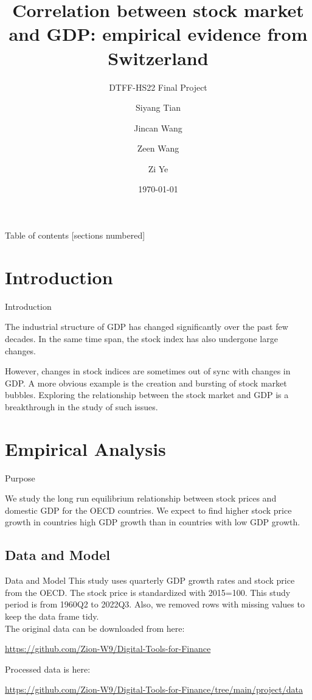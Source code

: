 \documentclass[10pt]{beamer}
\title{Correlation between stock market and GDP:
empirical evidence from Switzerland}
\subtitle{DTFF-HS22 Final Project}
\author{Siyang Tian \and Jincan Wang \and Zeen Wang \and Zi Ye}
\institute{University of Zurich}
\date{\today}
\begin{document}
\maketitle

\begin{frame}{Table of contents}
  [sections numbered]
  \tableofcontents%
\end{frame}

\section[Intro]{Introduction}

\begin{frame}{Introduction}

The industrial structure of GDP has changed significantly over the past few decades. In the same time span, the stock index has also undergone large changes. 

However, changes in stock indices are sometimes out of sync with changes in GDP. A more obvious example is the creation and bursting of stock market bubbles. Exploring the relationship between the stock market and GDP is a breakthrough in the study of such issues.
\end{frame}




\section{Empirical Analysis}

\begin{frame}{Purpose}

We study the long run equilibrium relationship between stock prices and domestic GDP for the OECD countries. We expect to find higher stock price growth in
countries high GDP growth than in countries with low GDP growth.

\end{frame}

\subsection{Data and Model}

\begin{frame}{Data and Model}
This study uses quarterly GDP growth rates and stock price from the OECD. The stock
price is standardized with 2015=100. This study period is from 1960Q2 to 2022Q3. Also, we removed rows with missing values to keep the data frame tidy.
\\
The original data can be downloaded from here:

\begin{center}\url{https://github.com/Zion-W9/Digital-Tools-for-Finance}\end{center}

Processed data is here:

\begin{center}\url{https://github.com/Zion-W9/Digital-Tools-for-Finance/tree/main/project/data}\end{center}

\end{frame}
\end{document}
